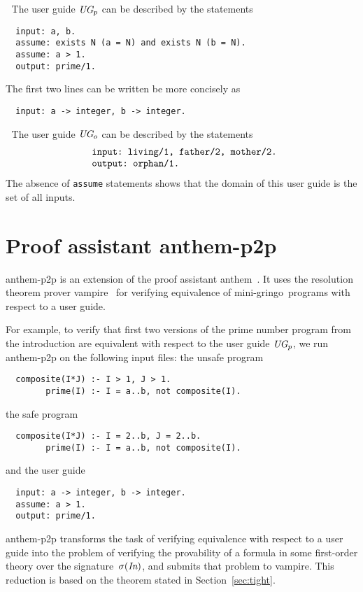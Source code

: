\documentclass{article}
\def\beq{\begin{equation}}
\def\eeq#1{\label{#1}\end{equation}}
\def\ba{\begin{array}}
\def\ea{\end{array}}
\def\gringo{{\sc gringo}}
\def\anthem{{\sc anthem}}
\def\vampire{{\sc vampire}}
\begin{document}
\medskip{}$\;$ The user guide $\emph{UG}_p$
can be described by the statements
\begin{verbatim}
  input: a, b.
  assume: exists N (a = N) and exists N (b = N).
  assume: a > 1.
  output: prime/1.
\end{verbatim}
The first two lines can be written be more concisely as
\begin{verbatim}
  input: a -> integer, b -> integer.
\end{verbatim}

\medskip{}$\;$ The user guide $\emph{UG}_o$
can be described by the statements
\beq\ba l
\verb| input: living/1, father/2, mother/2.|\\
\verb| output: orphan/1.|
\ea\eeq{ugo}
The absence of \verb|assume| statements shows that the domain of this
user guide is the set of all inputs.

\section{Proof assistant {\sc anthem-p2p}}

{\sc anthem-p2p} is an extension of the proof assistant \anthem\
\cite{fan20}.  It uses the resolution theorem prover \vampire\
\cite{vor13} for verifying equivalence of mini-\gringo\ programs with
respect to a user guide.

For example, to verify that first two versions of the prime number program
from the introduction are equivalent with respect to the user guide
$\emph{UG}_p$, we run {\sc anthem-p2p} on the following input files: the
unsafe program
\begin{verbatim}
  composite(I*J) :- I > 1, J > 1.
        prime(I) :- I = a..b, not composite(I).
\end{verbatim}
the safe program
\begin{verbatim}
  composite(I*J) :- I = 2..b, J = 2..b.
        prime(I) :- I = a..b, not composite(I).
\end{verbatim}
and the user guide
\begin{verbatim}
  input: a -> integer, b -> integer.
  assume: a > 1.
  output: prime/1.
\end{verbatim}
{\sc anthem-p2p} transforms the task of verifying equivalence
with respect to a user guide into the problem of verifying the provability of
a formula in some
first-order theory over the signature~$\sigma(\emph{In})$, and
submits that problem to \vampire.  This reduction is based on the theorem
stated in Section~\ref{sec:tight}.
\end{document}
